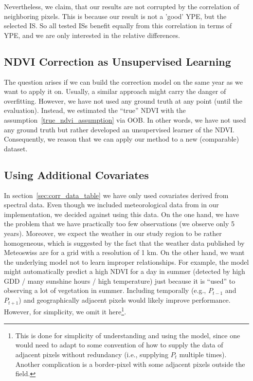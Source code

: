{{        Nevertheless, we claim, that our results are not corrupted by the correlation of neighboring pixels. This is because our result is not a 'good' YPE, but the selected IS. So all tested ISs benefit equally from this correlation in terms of YPE, and we are only interested in the relative differences.

    }

    \subsection{NDVI Correction as Unsupervised Learning}
        The question arises if we can build the correction model on the same year as we want to apply it on. Usually, a similar approach might carry the danger of overfitting. However, we have not used any ground truth at any point (until the evaluation). Instead, we estimated the ``true'' NDVI with the assumption~\ref{true_ndvi_assumption} via OOB. In other words, we have not used any ground truth but rather developed an unsupervised learner of the NDVI. Consequently, we reason that we can apply our method to a new (comparable) dataset.
    \subsection{Using Additional Covariates}{
        In section~\ref{sec:corr_data_table} we have only used covariates derived from spectral data. Even though we included meteorological data from \cite{perichPixelbasedCropYield2022} in our implementation,
        we decided against using this data. On the one hand, we have the problem that we have practically too few observations (we observe only 5 years). Moreover, we expect the weather in our study region to be rather homogeneous, which is suggested by the fact that the weather data published by Meteoswiss are for a grid with a resolution of 1 km. On the other hand, we want the underlying model not to learn improper relationships. For example, the model might automatically predict a high NDVI for a day in summer (detected by high GDD / many sunshine hours / high temperature) just because it is ``used'' to observing a lot of vegetation in summer. 
        Including temporally (e.g., $P_{t-1}$ and $P_{t+1}$) and geographically adjacent pixels would likely improve performance. However, for simplicity, we omit it here\footnote{This is done for simplicity of understanding and using the model, since one would need to adapt to some convention of how to supply the data of adjacent pixels without redundancy (i.e., supplying $P_t$ multiple times). Another complication is a border-pixel with some adjacent pixels outside the field.}.
    }
}


